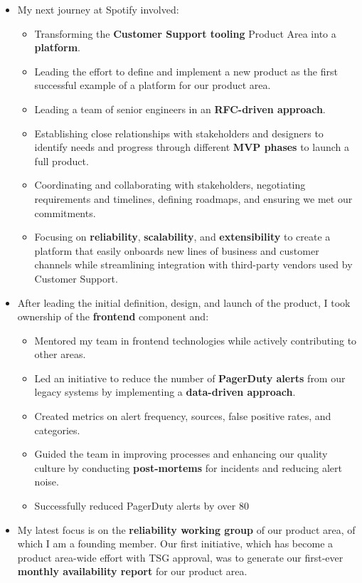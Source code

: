 \newpage
{}
\bigskip

\begin{itemize}

    \item My next journey at Spotify involved:
    \begin{itemize}
        \item Transforming the \textbf{Customer Support tooling} Product Area into a \textbf{platform}.
        \item Leading the effort to define and implement a new product as the first successful example of a platform for our product area.
        \item Leading a team of senior engineers in an \textbf{RFC-driven approach}.
        \item Establishing close relationships with stakeholders and designers to identify needs and progress through different \textbf{MVP phases} to launch a full product.
        \item Coordinating and collaborating with stakeholders, negotiating requirements and timelines, defining roadmaps, and ensuring we met our commitments.
        \item Focusing on \textbf{reliability}, \textbf{scalability}, and \textbf{extensibility} to create a platform that easily onboards new lines of business and customer channels while streamlining integration with third-party vendors used by Customer Support.
    \end{itemize}

    \item After leading the initial definition, design, and launch of the product, I took ownership of the \textbf{frontend} component and:
    \begin{itemize}
        \item Mentored my team in frontend technologies while actively contributing to other areas.
        \item Led an initiative to reduce the number of \textbf{PagerDuty alerts} from our legacy systems by implementing a \textbf{data-driven approach}.
        \item Created metrics on alert frequency, sources, false positive rates, and categories.
        \item Guided the team in improving processes and enhancing our quality culture by conducting \textbf{post-mortems} for incidents and reducing alert noise.
        \item Successfully reduced PagerDuty alerts by over 80%
    \end{itemize}

    \item My latest focus is on the \textbf{reliability working group} of our product area, of which I am a founding member. Our first initiative, which has become a product area-wide effort with TSG approval, was to generate our first-ever \textbf{monthly availability report} for our product area.
\end{itemize}